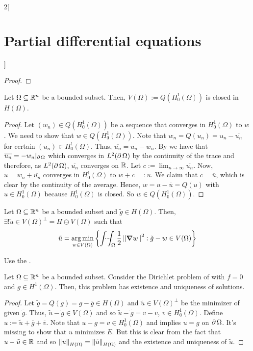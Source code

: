 \documentclass[../../../main_math.tex]{subfiles}
\begin{document}
\begin{multicols}{2}[\section{Partial differential equations}]
\begin{proof}
  \end{proof}
  \begin{proposition}
    Let $\Omega\subseteq \mathbb{R}^n$ be a bounded subset. Then, $V(\Omega):=Q(H_0^1(\Omega))$ is closed in $H(\Omega)$.
  \end{proposition}
  \begin{proof}
    Let $(w_n)\in Q(H_0^1(\Omega))$ be a sequence that converges in $H_0^1(\Omega)$ to $w$. We need to show that $w\in Q(H_0^1(\Omega))$. Note that $w_n=Q(u_n)=u_n-\overline{u_n}$ for certain $(u_n)\in H_0^1(\Omega)$. Thus, $\overline{u_n} = u_n -w_n$. By  we have that $\overline{u_n} = -w_n|_{\operatorname{\partial}{\Omega}}$ which converges in $L^2(\operatorname{\partial}{\Omega})$ by the continuity of the trace and therefore, as $L^2(\operatorname{\partial}{\Omega})$, $\overline{u_n}$ converges on $\mathbb{R}$. Let $\displaystyle c:=\lim_{n\to\infty}\overline{u_n}$. Now, $u=w_n+\overline{u_n}$ converges in $H_0^1(\Omega)$ to $w+c=:u$. We claim that $c=\overline{u}$, which is clear by the continuity of the average. Hence, $w=u-\overline{u} =Q(u)$ with $u\in H_0^1(\Omega)$ because $ H_0^1(\Omega)$ is closed. So $w\in Q(H_0^1(\Omega))$.
  \end{proof}
  \begin{proposition}\label{PDE:preexistence}
    Let $\Omega\subseteq \mathbb{R}^n$ be a bounded subset and $\tilde{g}\in H(\Omega)$. Then, $\exists! \tilde{u}\in {V(\Omega)}^\perp=H\ominus V(\Omega)$ such that $$\tilde{u}=\operatorname*{arg\,min}_{w\in V(\Omega)}\left\{\idotsint_\Omega\frac{1}{2}\left\|\grad w\right\|^2:\tilde{g}-w\in V(\Omega)\right\}$$
  \end{proposition}
  \begin{sproof}
    Use the .
  \end{sproof}
  \begin{theorem}
    Let $\Omega\subseteq \mathbb{R}^n$ be a bounded subset. Consider the Dirichlet problem of  with $f=0$ and $g\in H^1(\Omega)$. Then, this problem has existence and uniqueness of solutions.
  \end{theorem}
  \begin{proof}
    Let $\tilde{g}=Q(g)=g-\overline{g}\in H(\Omega)$ and $\tilde{u}\in{V(\Omega)}^\perp$ be the minimizer of  given $\tilde{g}$. Thus, $\tilde{u}-\tilde{g}\in V(\Omega)$ and so $\tilde{u}-\tilde{g}=v-\overline{v}$, $v\in H_0^1(\Omega)$. Define $u:=\tilde{u}+\overline{g}+\overline{v}$. Note that $u-g=v\in H_0^1(\Omega)$ and  implies $u=g$ on $\operatorname{\partial}{\Omega}$. It's missing to show that $u$ minimizes $E$. But this is clear from the fact that $u-\tilde{u}\in\mathbb{R}$ and so $\left\|u\right\|_{H(\Omega)}=\left\|\tilde{u}\right\|_{H(\Omega)}$ and the existence and uniqueness of $\tilde{u}$.
  \end{proof}
\end{multicols}
\end{document}
